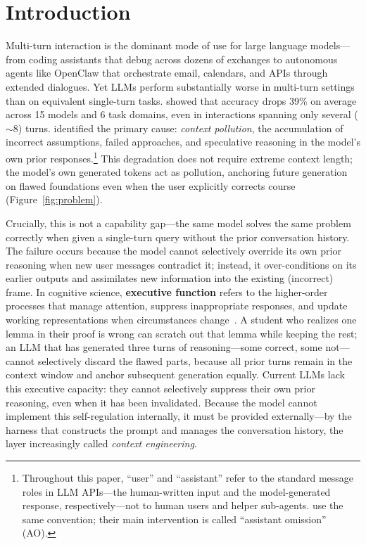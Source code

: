 \documentclass{article} %
\begin{document}
\section{Introduction}
\label{sec:intro}

Multi-turn interaction is the dominant mode of use for large language models---from coding assistants that debug across dozens of exchanges to autonomous agents like OpenClaw that orchestrate email, calendars, and APIs through extended dialogues. Yet LLMs perform substantially worse in multi-turn settings than on equivalent single-turn tasks. \citet{laban2025lost} showed that accuracy drops 39\% on average across 15 models and 6 task domains, even in interactions spanning only several ($\sim$8) turns. \citet{huang2026context} identified the primary cause: \emph{context pollution}, the accumulation of incorrect assumptions, failed approaches, and speculative reasoning in the model's own prior responses.\footnote{Throughout this paper, ``user'' and ``assistant'' refer to the standard message roles in LLM APIs---the human-written input and the model-generated response, respectively---not to human users and helper sub-agents. \citet{huang2026context} use the same convention; their main intervention is called ``assistant omission'' (AO).} This degradation does not require extreme context length; the model's own generated tokens act as pollution, anchoring future generation on flawed foundations even when the user explicitly corrects course (Figure~\ref{fig:problem}).

Crucially, this is not a capability gap---the same model solves the same problem correctly when given a single-turn query without the prior conversation history. The failure occurs because the model cannot selectively override its own prior reasoning when new user messages contradict it; instead, it over-conditions on its earlier outputs and assimilates new information into the existing (incorrect) frame. In cognitive science, \textbf{executive function} refers to the higher-order processes that manage attention, suppress inappropriate responses, and update working representations when circumstances change~\citep{miyake2000unity,diamond2013executive}. A student who realizes one lemma in their proof is wrong can scratch out that lemma while keeping the rest; an LLM that has generated three turns of reasoning---some correct, some not---cannot selectively discard the flawed parts, because all prior turns remain in the context window and anchor subsequent generation equally. Current LLMs lack this executive capacity: they cannot selectively suppress their own prior reasoning, even when it has been invalidated. Because the model cannot implement this self-regulation internally, it must be provided externally---by the harness that constructs the prompt and manages the conversation history, the layer increasingly called \emph{context engineering}.
\end{document}
